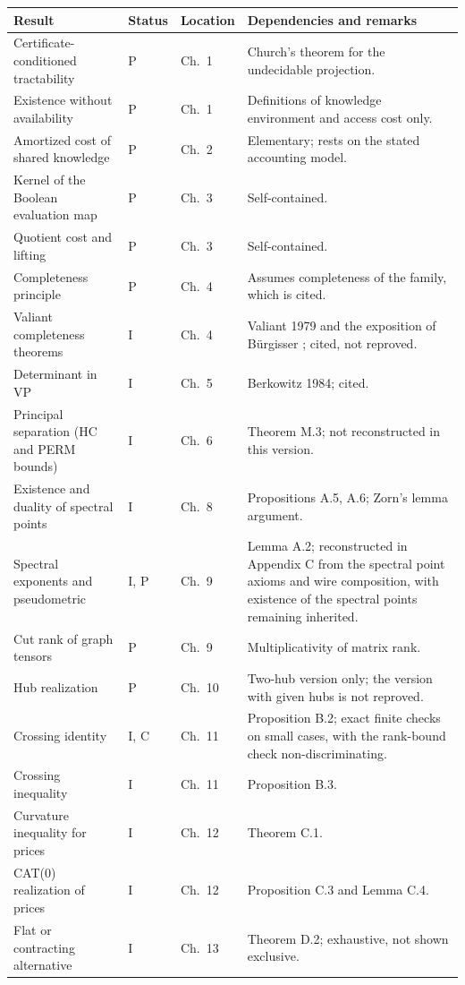 \documentclass[11pt,letterpaper]{report}
\theoremstyle{plain}
\theoremstyle{definition}
\theoremstyle{remark}
\begin{document}
{\small
\begin{longtable}{p{}p{}p{}p{}}
\hline
Result & Status & Location & Dependencies and remarks\\
\hline
\endhead
Certificate-conditioned tractability & P & Ch.\ 1 & Church's theorem for the undecidable projection.\\
Existence without availability & P & Ch.\ 1 & Definitions of knowledge environment and access cost only.\\
Amortized cost of shared knowledge & P & Ch.\ 2 & Elementary; rests on the stated accounting model.\\
Kernel of the Boolean evaluation map & P & Ch.\ 3 & Self-contained.\\
Quotient cost and lifting & P & Ch.\ 3 & Self-contained.\\
Completeness principle & P & Ch.\ 4 & Assumes completeness of the family, which is cited.\\
Valiant completeness theorems & I & Ch.\ 4 & Valiant 1979 and the exposition of B\"urgisser \cite{Burgisser2000}; cited, not reproved.\\
Determinant in VP & I & Ch.\ 5 & Berkowitz 1984; cited.\\
Principal separation (HC and PERM bounds) & I & Ch.\ 6 & Theorem M.3; not reconstructed in this version.\\
Existence and duality of spectral points & I & Ch.\ 8 & Propositions A.5, A.6; Zorn's lemma argument.\\
Spectral exponents and pseudometric & I, P & Ch.\ 9 & Lemma A.2; reconstructed in Appendix C from the spectral point axioms and wire composition, with existence of the spectral points remaining inherited.\\
Cut rank of graph tensors & P & Ch.\ 9 & Multiplicativity of matrix rank.\\
Hub realization & P & Ch.\ 10 & Two-hub version only; the version with given hubs is not reproved.\\
Crossing identity & I, C & Ch.\ 11 & Proposition B.2; exact finite checks on small cases, with the rank-bound check non-discriminating.\\
Crossing inequality & I & Ch.\ 11 & Proposition B.3.\\
Curvature inequality for prices & I & Ch.\ 12 & Theorem C.1.\\
CAT(0) realization of prices & I & Ch.\ 12 & Proposition C.3 and Lemma C.4.\\
Flat or contracting alternative & I & Ch.\ 13 & Theorem D.2; exhaustive, not shown exclusive.\\

\end{longtable}}
\end{document}
